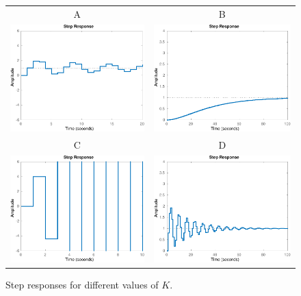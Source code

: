 \documentclass[letter,12pt]{article}
\begin{document}
\begin{figure}[tp]
\begin{center}
\begin{tabular}{cc}
A & B\\
\includegraphics[width=0.4\linewidth]{step-plot-3-crop}
&\includegraphics[width=0.4\linewidth]{step-plot-1-crop}\\
C & D\\
\includegraphics[width=0.4\linewidth]{step-plot-5-crop}
&\includegraphics[width=0.4\linewidth]{step-plot-2-crop}

\end{tabular}
\caption{Step responses for different values of $K$.}
\label{fig:step}
\end{center}
\end{figure}
\end{document}
